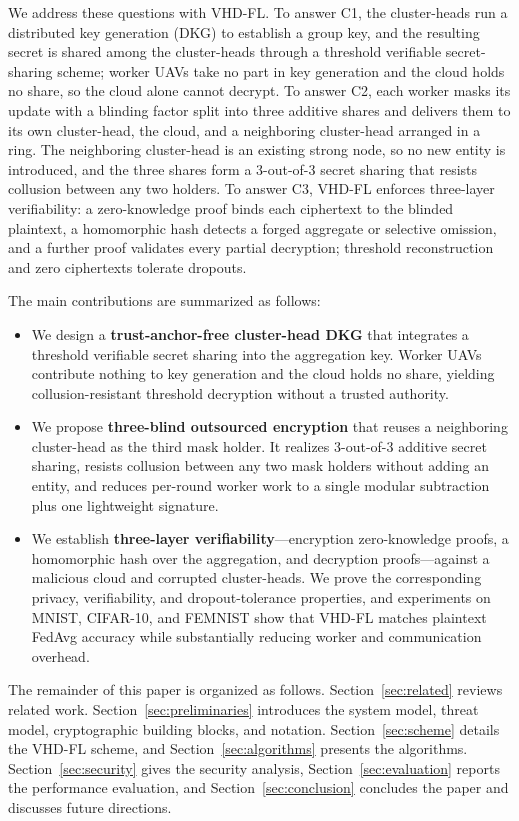 We address these questions with \textsc{VHD-FL}. To answer C1, the cluster-heads run a distributed key generation (DKG) to establish a group key, and the resulting secret is shared among the cluster-heads through a threshold verifiable secret-sharing scheme; worker UAVs take no part in key generation and the cloud holds no share, so the cloud alone cannot decrypt. To answer C2, each worker masks its update with a blinding factor split into three additive shares and delivers them to its own cluster-head, the cloud, and a neighboring cluster-head arranged in a ring. The neighboring cluster-head is an existing strong node, so no new entity is introduced, and the three shares form a 3-out-of-3 secret sharing that resists collusion between any two holders. To answer C3, \textsc{VHD-FL} enforces three-layer verifiability: a zero-knowledge proof binds each ciphertext to the blinded plaintext, a homomorphic hash detects a forged aggregate or selective omission, and a further proof validates every partial decryption; threshold reconstruction and zero ciphertexts tolerate dropouts.

The main contributions are summarized as follows:
\begin{itemize}[leftmargin=*,topsep=2pt,itemsep=1pt]
  \item We design a \textbf{trust-anchor-free cluster-head DKG} that integrates a threshold verifiable secret sharing into the aggregation key. Worker UAVs contribute nothing to key generation and the cloud holds no share, yielding collusion-resistant threshold decryption without a trusted authority.
  \item We propose \textbf{three-blind outsourced encryption} that reuses a neighboring cluster-head as the third mask holder. It realizes 3-out-of-3 additive secret sharing, resists collusion between any two mask holders without adding an entity, and reduces per-round worker work to a single modular subtraction plus one lightweight signature.
  \item We establish \textbf{three-layer verifiability}---encryption zero-knowledge proofs, a homomorphic hash over the aggregation, and decryption proofs---against a malicious cloud and corrupted cluster-heads. We prove the corresponding privacy, verifiability, and dropout-tolerance properties, and experiments on MNIST, CIFAR-10, and FEMNIST show that \textsc{VHD-FL} matches plaintext FedAvg accuracy while substantially reducing worker and communication overhead.
\end{itemize}

The remainder of this paper is organized as follows. Section~\ref{sec:related} reviews related work. Section~\ref{sec:preliminaries} introduces the system model, threat model, cryptographic building blocks, and notation. Section~\ref{sec:scheme} details the \textsc{VHD-FL} scheme, and Section~\ref{sec:algorithms} presents the algorithms. Section~\ref{sec:security} gives the security analysis, Section~\ref{sec:evaluation} reports the performance evaluation, and Section~\ref{sec:conclusion} concludes the paper and discusses future directions.
